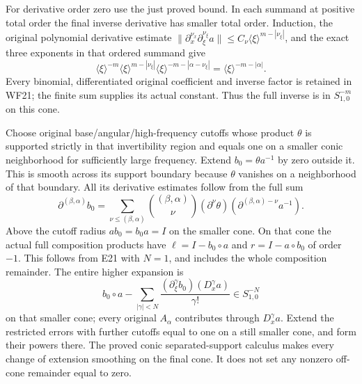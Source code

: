 \documentclass[
  11pt,
]{article}
\begin{document}
For derivative order zero use the just proved bound. In each summand at
positive total order the final inverse derivative has smaller total
order. Induction, the original polynomial derivative estimate
\(\|\partial_x^{\nu_x}\partial_\xi^{\nu_\xi}a\|
\leq C_\nu\langle\xi\rangle^{m-|\nu_\xi|}\), and the exact three
exponents in that ordered summand give \[
\langle\xi\rangle^{-m}
\langle\xi\rangle^{m-|\nu_\xi|}
\langle\xi\rangle^{-m-|\alpha-\nu_\xi|}
=\langle\xi\rangle^{-m-|\alpha|}.
\tag{WF22}
\] Every binomial, differentiated original coefficient and inverse
factor is retained in WF21; the finite sum supplies its actual constant.
Thus the full inverse is in \(S^{-m}_{1,0}\) on this cone.

Choose original base/angular/high-frequency cutoffs whose product
\(\theta\) is supported strictly in that invertibility region and equals
one on a smaller conic neighborhood for sufficiently large frequency.
Extend \(b_0=\theta a^{-1}\) by zero outside it. This is smooth across
its support boundary because \(\theta\) vanishes on a neighborhood of
that boundary. All its derivative estimates follow from the full sum \[
\partial^{(\beta,\alpha)}b_0
 =\sum_{\nu\leq(\beta,\alpha)}
   \binom{(\beta,\alpha)}{\nu}
   (\partial^\nu\theta)
   (\partial^{(\beta,\alpha)-\nu}a^{-1}).
\tag{WF23}
\] Above the cutoff radius \(ab_0=b_0a=I\) on the smaller cone. On that
cone the actual full composition products have \(\ell=I-b_0\circ a\) and
\(r=I-a\circ b_0\) of order \(-1\). This follows from E21 with \(N=1\),
and includes the whole composition remainder. The entire higher
expansion is \[
b_0\circ a-
 \sum_{|\gamma|<N}
  \frac{(\partial_\xi^\gamma b_0)(D_x^\gamma a)}{\gamma!}
 \in S^{-N}_{1,0}
\tag{WF24}
\] on that smaller cone; every original \(A_\alpha\) contributes through
\(D_x^\gamma a\). Extend the restricted errors with further cutoffs
equal to one on a still smaller cone, and form their powers there. The
proved conic separated-support calculus makes every change of extension
smoothing on the final cone. It does not set any nonzero off-cone
remainder equal to zero.
\end{document}
